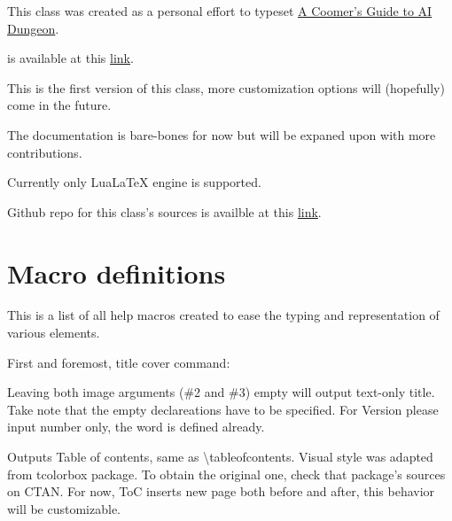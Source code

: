 \documentclass[a4paper,12pt,american,oneside]{aidg} %
\begin{document}

\tcolortoc


This class was created as a personal effort to typeset \href{https://guide.aidg.club/A-Coomers-guide-to-AI-Dungeon/A\%20Coomer's\%20Guide\%20to\%20AI\%20Dungeon.pdf}{A Coomer's Guide to AI Dungeon}.

\aid is available at this \href{https://play.aidungeon.io}{link}.

This is the first version of this class, more customization options will (hopefully) come in the future.

The documentation is bare-bones for now but will be expaned upon with more contributions.

Currently only LuaLaTeX engine is supported.

Github repo for this class's sources is availble at this \href{https://github.com/CoomersGuide/CoomersGuide.github.io}{link}.

\chapter{Macro definitions}

This is a list of all help macros created to ease the typing and representation of various \aid elements.


First and foremost, title cover command:

\begin{aidgdoc}
\end{aidgdoc}

Leaving both image arguments (\#2 and \#3) empty will output text-only title. 
Take note that the empty declareations have to be specified.
For Version please input number only, the word is defined already.

\begin{aidgdoc}
	\tcolortoc
\end{aidgdoc}

Outputs Table of contents, same as \textbackslash tableofcontents.
Visual style was adapted from tcolorbox package.
To obtain the original one, check that package's sources on CTAN.
For now, ToC inserts new page both before and after, this behavior will be customizable.
\end{document}
